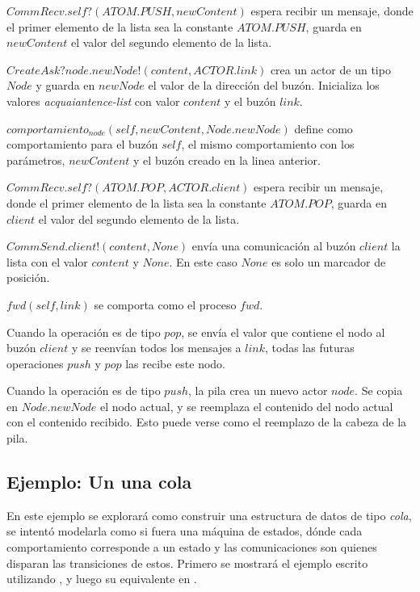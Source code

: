 \begin{description}
 \item $CommRecv.self?(ATOM.PUSH, newContent)$ espera recibir un mensaje, donde el primer elemento de la lista sea la constante $ATOM.PUSH$, guarda en $newContent$ el valor del segundo elemento de la lista.
 \item $CreateAsk?node.newNode!(content, ACTOR.link)$ crea un actor de un tipo $Node$ y guarda en $newNode$ el valor de la dirección del buzón. Inicializa los valores \textit{acquaiantence-list} con valor $content$ y el buzón $link$.
 \item $comportamiento_{node}(self, newContent, Node.newNode)$ define como comportamiento para el buzón $self$, el mismo comportamiento con los parámetros, $newContent$ y el buzón creado en la linea anterior.
 \item $CommRecv.self?(ATOM.POP, ACTOR.client)$ espera recibir un mensaje, donde el primer elemento de la lista sea la constante $ATOM.POP$, guarda en $client$ el valor del segundo elemento de la lista.
 \item $CommSend.client!(content, None)$ envía una comunicación al buzón $client$ la lista con el valor $content$ y $None$. En este caso $None$ es solo un marcador de posición.
 \item $fwd(self, link)$ se comporta como el proceso $fwd$. 
\end{description}

Cuando la operación es de tipo $pop$, se envía el valor que contiene el nodo al buzón $client$ y se reenvían todos los mensajes a $link$, todas las futuras operaciones $push$ y $pop$ las recibe este nodo.

Cuando la operación es de tipo $push$, la pila crea un nuevo actor $node$. Se copia en $Node.newNode$ el nodo actual, y se reemplaza el contenido del nodo actual con el contenido recibido. Esto puede verse como el reemplazo de la cabeza de la pila.

\subsection{Ejemplo: Un una cola}

En este ejemplo se explorará como construir una estructura de datos de tipo \textit{cola}, se intentó modelarla como si fuera una máquina de estados, dónde cada comportamiento corresponde a un estado y las comunicaciones son quienes disparan las transiciones de estos. Primero se mostrará el ejemplo escrito utilizando \SAL, y luego su equivalente en \CSPm.

